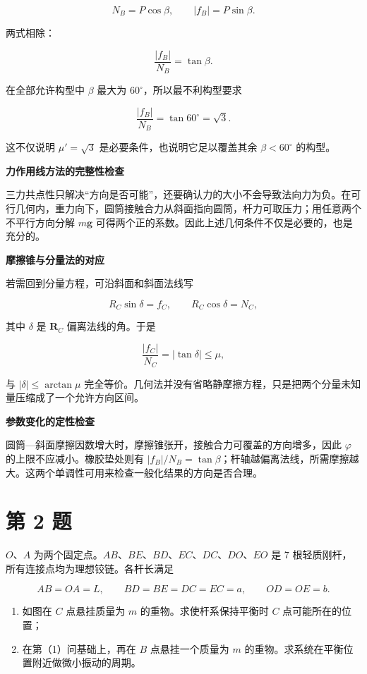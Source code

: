 \documentclass[12pt,a4paper,UTF8]{ctexart}
\newcommand{\tightlist}{\setlength{\itemsep}{0pt}\setlength{\parskip}{0pt}}
\begin{document}
\[
N_B=P\cos\beta,
\qquad
|f_B|=P\sin\beta.
\]

两式相除：

\[
\frac{|f_B|}{N_B}=\tan\beta.
\tag{3}
\]

在全部允许构型中 \(\beta\) 最大为 \(60^\circ\)，所以最不利构型要求

\[
\frac{|f_B|}{N_B}=\tan60^\circ=\sqrt3.
\]

这不仅说明 \(\mu'=\sqrt3\) 是必要条件，也说明它足以覆盖其余
\(\beta<60^\circ\) 的构型。

\textbf{力作用线方法的完整性检查}

三力共点性只解决``方向是否可能''，还要确认力的大小不会导致法向力为负。在可行几何内，重力向下，圆筒接触合力从斜面指向圆筒，杆力可取压力；用任意两个不平行方向分解
\(m\bm g\) 可得两个正的系数。因此上述几何条件不仅是必要的，也是充分的。

\textbf{摩擦锥与分量法的对应}

若需回到分量方程，可沿斜面和斜面法线写

\[
R_C\sin\delta=f_C,
\qquad
R_C\cos\delta=N_C,
\]

其中 \(\delta\) 是 \(\bm R_C\) 偏离法线的角。于是

\[
\frac{|f_C|}{N_C}=|\tan\delta|\leq\mu,
\]

与 \(|\delta|\leq\arctan\mu\)
完全等价。几何法并没有省略静摩擦方程，只是把两个分量未知量压缩成了一个允许方向区间。

\textbf{参数变化的定性检查}

圆筒---斜面摩擦因数增大时，摩擦锥张开，接触合力可覆盖的方向增多，因此
\(\varphi\) 的上限不应减小。橡胶垫处则有
\(|f_B|/N_B=\tan\beta\)；杆轴越偏离法线，所需摩擦越大。这两个单调性可用来检查一般化结果的方向是否合理。

\newpage

\section{第 2 题}\label{ux7b2c-2-ux9898}

\(O\)、\(A\)
为两个固定点。\(AB\)、\(BE\)、\(BD\)、\(EC\)、\(DC\)、\(DO\)、\(EO\) 是
7 根轻质刚杆，所有连接点均为理想铰链。各杆长满足

\[
AB=OA=L,\qquad
BD=BE=DC=EC=a,\qquad
OD=OE=b.
\]

\begin{enumerate}
\def\labelenumi{\arabic{enumi}.}
\tightlist
\item
  如图在 \(C\) 点悬挂质量为 \(m\) 的重物。求使杆系保持平衡时 \(C\)
  点可能所在的位置；
\item
  在第（1）问基础上，再在 \(B\) 点悬挂一个质量为 \(m\)
  的重物。求系统在平衡位置附近做微小振动的周期。
\end{enumerate}
\end{document}
